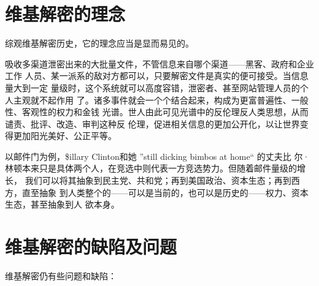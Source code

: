 \section{维基解密的理念}

综观维基解密历史，它的理念应当是显而易见的。

吸收多渠道泄密出来的大批量文件，不管信息来自哪个渠道——黑客、政府和企业工作
人员、某一派系的敌对方都可以，只要解密文件是真实的便可接受。当信息量大到一定
量级时，这个系统就可以高度容错，泄密者、甚至网站管理人员的个人主观就不起作用
了。诸多事件就会一个个结合起来，构成为更富普遍性、一般性、客观性的权力和金钱
光谱。世人由此可见光谱中的反伦理反人类思想，从而谴责、批评、改造、审判这种反
伦理，促进相关信息的更加公开化，以让世界变得更加阳光美好、公正平等。

以邮件门为例，\$illary Clinton和她 ''still dicking bimbos at home`` 的丈夫比
尔·林顿本来只是具体两个人，在竞选中则代表一方竞选势力。但随着邮件量级的增长，
我们可以将其抽象到民主党、共和党；再到美国政治、资本生态；再到西方，直至抽象
到人类整个的——可以是当前的，也可以是历史的——权力、资本生态，甚至抽象到人
欲本身。

\section{维基解密的缺陷及问题}

维基解密仍有些问题和缺陷：

